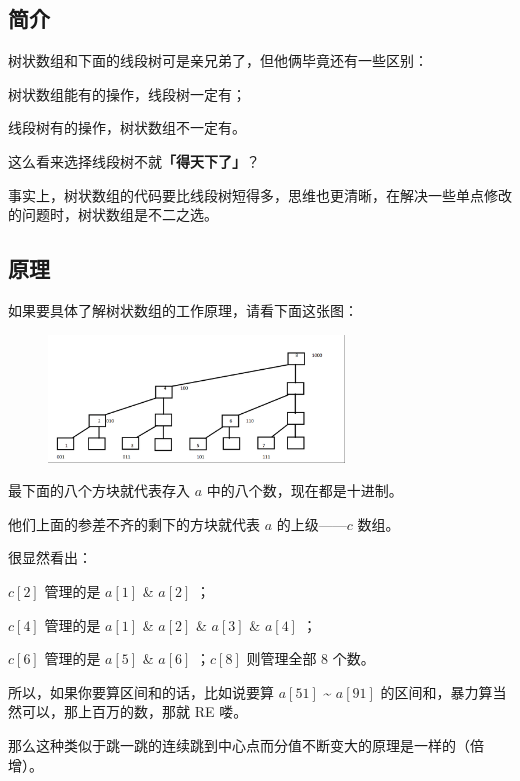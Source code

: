 
\subsection{简介}

\hr

树状数组和下面的线段树可是亲兄弟了，但他俩毕竟还有一些区别：  

树状数组能有的操作，线段树一定有；  

线段树有的操作，树状数组不一定有。

这么看来选择线段树不就\textbf{「得天下了」}？

事实上，树状数组的代码要比线段树短得多，思维也更清晰，在解决一些单点修改的问题时，树状数组是不二之选。

\hr

\subsection{原理}

如果要具体了解树状数组的工作原理，请看下面这张图：

\begin{figure}[htbp]
\centering
\includegraphics[width=0.7\textwidth]{docs/ds/images/bit1.png} 

\end{figure}

最下面的八个方块就代表存入 $a$ 中的八个数，现在都是十进制。

他们上面的参差不齐的剩下的方块就代表 $a$ 的上级——$c$ 数组。

很显然看出：  

$c[2]$ 管理的是 $a[1]$ \& $a[2]$ ；  

$c[4]$ 管理的是 $a[1]$ \& $a[2]$ \& $a[3]$ \& $a[4]$ ；  

$c[6]$ 管理的是 $a[5]$ \& $a[6]$ ；$c[8]$ 则管理全部 $8$ 个数。

所以，如果你要算区间和的话，比如说要算 $a[51]$ \textasciitilde{} $a[91]$ 的区间和，暴力算当然可以，那上百万的数，那就 RE 喽。

那么这种类似于跳一跳的连续跳到中心点而分值不断变大的原理是一样的（倍增）。

